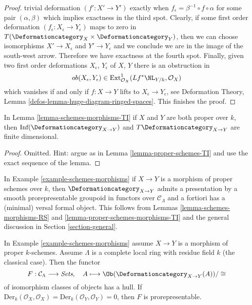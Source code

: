 \begin{proof}
trivial deformation $(f' : X' \to Y')$ exactly when
$f_\epsilon  = \beta^{-1} \circ f \circ \alpha$ for some
pair $(\alpha, \beta)$ which implies exactness in the third spot.
Clearly, if some first order deformation
$(f_\epsilon : X_\epsilon \to Y_\epsilon)$
maps to zero in $T(\Deformationcategory_X \times \Deformationcategory_Y)$,
then we can choose isomorphisms $X' \to X_\epsilon$ and $Y' \to Y_\epsilon$
and we conclude we are in the image of the south-west arrow.
Therefore we have exactness at the fourth spot.
Finally, given two first order deformations $X_\epsilon$, $Y_\epsilon$
of $X$, $Y$ there is an obstruction in
$$
ob(X_\epsilon, Y_\epsilon) \in
\text{Ext}^1_{\mathcal{O}_X}(Lf^*\NL_{Y/k}, \mathcal{O}_X)
$$
which vanishes if and only if $f : X \to Y$ lifts to
$X_\epsilon \to Y_\epsilon$, see
Deformation Theory, Lemma \ref{defos-lemma-huge-diagram-ringed-spaces}.
This finishes the proof.
\end{proof}

\begin{lemma}
\label{lemma-proper-schemes-morphisms-TI}
In Lemma \ref{lemma-schemes-morphisms-TI} if $X$ and $Y$ are both
proper over $k$, then
$\text{Inf}(\Deformationcategory_{X \to Y})$ and
$T\Deformationcategory_{X \to Y}$ are finite dimensional.
\end{lemma}

\begin{proof}
Omitted. Hint: argue as in Lemma \ref{lemma-proper-schemes-TI}
and use the exact sequence of the lemma.
\end{proof}

\noindent
In Example \ref{example-schemes-morphisms}
if $X \to Y$ is a morphism of proper schemes over $k$,
then $\Deformationcategory_{X \to Y}$
admits a presentation by a smooth prorepresentable groupoid in functors
over $\mathcal{C}_\Lambda$
and a fortiori has a (minimal) versal formal object. This follows
from Lemmas \ref{lemma-schemes-morphisms-RS} and
\ref{lemma-proper-schemes-morphisms-TI}
and the general discussion in Section \ref{section-general}.

\begin{lemma}
\label{lemma-schemes-morphisms-hull}
In Example \ref{example-schemes-morphisms} assume $X \to Y$
is a morphism of proper $k$-schemes.
Assume $\Lambda$ is a complete local ring with residue field $k$
(the classical case). Then the functor
$$
F : \mathcal{C}_\Lambda \longrightarrow \textit{Sets},\quad
A \longmapsto \Ob(\Deformationcategory_{X \to Y}(A))/\cong
$$
of isomorphism classes of objects has a hull. If
$\text{Der}_k(\mathcal{O}_X, \mathcal{O}_X) =
\text{Der}_k(\mathcal{O}_Y, \mathcal{O}_Y) = 0$, then
$F$ is prorepresentable.
\end{lemma}

